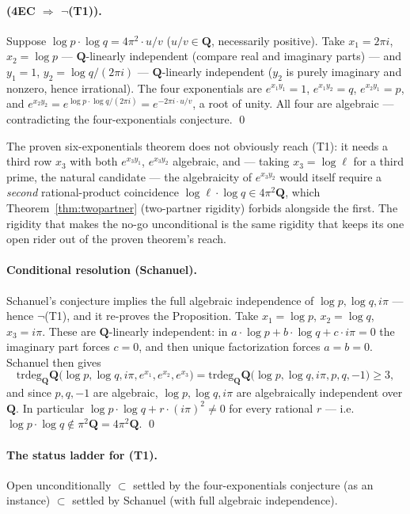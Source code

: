 \documentclass[11pt]{article}
\theoremstyle{definition}
\theoremstyle{remark}
\newcommand{\Q}{\mathbf{Q}}
\newcommand{\trdeg}{\mathrm{trdeg}}
\begin{document}
\paragraph{(4EC $\Longrightarrow$ $\neg$(T1)).} Suppose
$\log p\cdot\log q = 4\pi^2\cdot u/v$ ($u/v \in \Q$, necessarily positive).
Take $x_1 = 2\pi i$, $x_2 = \log p$ --- $\Q$-linearly independent (compare
real and imaginary parts) --- and $y_1 = 1$, $y_2 = \log q/(2\pi i)$ ---
$\Q$-linearly independent ($y_2$ is purely imaginary and nonzero, hence
irrational). The four exponentials are $e^{x_1 y_1} = 1$,
$e^{x_1 y_2} = q$, $e^{x_2 y_1} = p$, and
$e^{x_2 y_2} = e^{\log p\cdot\log q/(2\pi i)} = e^{-2\pi i\cdot u/v}$, a
root of unity. All four are algebraic --- contradicting the
four-exponentials conjecture. \qed

The proven six-exponentials theorem does not obviously reach (T1): it needs a
third row $x_3$ with both $e^{x_3 y_1}$, $e^{x_3 y_2}$ algebraic, and ---
taking $x_3 = \log \ell$ for a third prime, the natural candidate --- the
algebraicity of $e^{x_3 y_2}$ would itself require a \emph{second}
rational-product coincidence $\log \ell\cdot\log q \in 4\pi^2\Q$, which
Theorem~\ref{thm:twopartner} (two-partner rigidity) forbids alongside the
first. The rigidity that makes the no-go unconditional is the same rigidity
that keeps its one open rider out of the proven theorem's reach.

\paragraph{Conditional resolution (Schanuel).}
Schanuel's conjecture implies the full algebraic independence of
$\log p, \log q, i\pi$ --- hence $\neg$(T1), and it re-proves the
Proposition. Take $x_1 = \log p$, $x_2 = \log q$, $x_3 = i\pi$. These are
$\Q$-linearly independent: in $a\cdot\log p + b\cdot\log q + c\cdot i\pi = 0$
the imaginary part forces $c = 0$, and then unique factorization forces
$a = b = 0$. Schanuel then gives
\[
\trdeg_{\Q} \Q\bigl(\log p, \log q, i\pi, e^{x_1}, e^{x_2}, e^{x_3}\bigr)
= \trdeg_{\Q} \Q\bigl(\log p, \log q, i\pi, p, q, -1\bigr) \geq 3 ,
\]
and since $p, q, -1$ are algebraic, $\log p, \log q, i\pi$ are algebraically
independent over $\Q$. In particular
$\log p\cdot\log q + r\cdot(i\pi)^2 \neq 0$ for every rational $r$ --- i.e.\
$\log p\cdot\log q \notin \pi^2\Q = 4\pi^2\Q$. \qed

\paragraph{The status ladder for (T1).}
Open unconditionally $\subset$ settled by the four-exponentials conjecture
(as an instance) $\subset$ settled by Schanuel (with full algebraic
independence).
\end{document}
